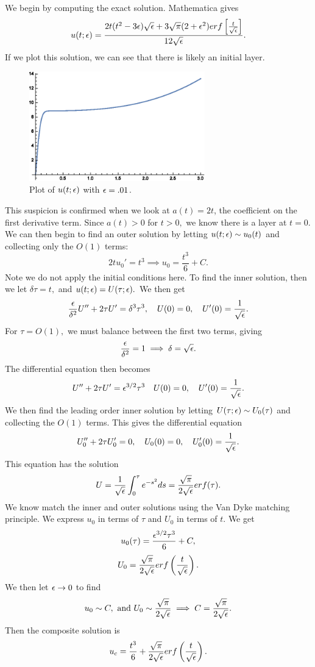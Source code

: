 We begin by computing the exact solution. Mathematica gives
$$u(t;\epsilon)=\frac{2t(t^2-3\epsilon)\sqrt{\epsilon}+3\sqrt{\pi}(2+\epsilon^2)erf\left[\frac{t}{\sqrt{\epsilon}}\right]}{12\sqrt{\epsilon}}.$$
If we plot this solution, we can see that there is likely an initial layer.
\begin{figure}[h]
\centering
\includegraphics[width=3in]{test1no2}
\caption{Plot of $u(t;\epsilon)$ with $\epsilon=.01$.}
\end{figure}
This suspicion is confirmed when we look at $a(t)=2t$, the coefficient on the first derivative term. Since $a(t)>0$ for $t>0,$ we know there is a layer at $t=0.$
We can then begin to find an outer solution by letting $u(t;\epsilon)\sim u_0(t)$ and collecting only the $O(1)$ terms:
$$2t u_0'=t^3\implies u_0=\frac{t^3}{6}+C.$$
Note we do not apply the initial conditions here. To find the inner solution, then we let $\delta\tau =t,$ and $u(t;\epsilon)=U(\tau;\epsilon).$ We then get
$$\frac{\epsilon}{\delta^2}U''+2\tau U'=\delta^3\tau^3,\quad  U(0)=0,\quad U'(0)=\frac{1}{\sqrt{\epsilon}} .$$
For $\tau=O(1),$ we must balance between the first two terms, giving
$$\frac{\epsilon}{\delta^2}=1\implies \delta=\sqrt{\epsilon}.$$
The differential equation then becomes
$$U''+2\tau U'=\epsilon^{3/2}\tau^3\quad  U(0)=0,\quad U'(0)=\frac{1}{\sqrt{\epsilon}}.$$
We then find the leading order inner solution by letting $U(\tau;\epsilon)\sim U_0(\tau)$ and collecting the $O(1)$ terms. This gives the differential equation
$$U_0''+2\tau U_0'=0,\quad U_0(0)=0,\quad U_0'(0)=\frac{1}{\sqrt{\epsilon}}.$$
This equation has the solution
$$U=\frac{1}{\sqrt{\epsilon}}\int_0^\tau e^{-s^2}ds=\frac{\sqrt{\pi}}{2\sqrt{\epsilon}}erf(\tau).$$
We know match the inner and outer solutions using the Van Dyke matching principle. We express $u_0$ in terms of $\tau$ and $U_0$ in terms of $t$. We get
$$u_0(\tau)=\frac{\epsilon^{3/2}\tau^3}{6}+C,$$
$$U_0=\frac{\sqrt{\pi}}{2\sqrt{\epsilon}}erf\left(\frac{t}{\sqrt{\epsilon}}\right).$$
We then let $\epsilon\to 0$ to find
$$u_0\sim C,\text{ and }U_0\sim\frac{\sqrt{\pi}}{2\sqrt{\epsilon}}\implies C=\frac{\sqrt{\pi}}{2\sqrt{\epsilon}}.$$
Then the composite solution is
$$u_c=\frac{t^3}{6}+\frac{\sqrt{\pi}}{2\sqrt{\epsilon}}erf\left(\frac{t}{\sqrt{\epsilon}}\right).$$
